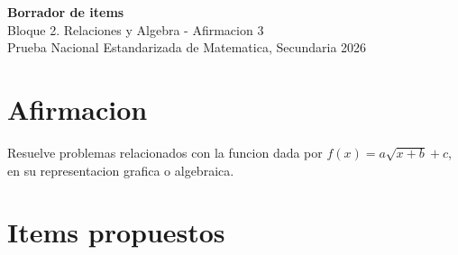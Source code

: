 \documentclass[12pt]{article}
\begin{document}
\begin{center}
  {\Large \textbf{Borrador de items}}\\
  {\large Bloque 2. Relaciones y Algebra - Afirmacion 3}\\[4pt]
  Prueba Nacional Estandarizada de Matematica, Secundaria 2026
\end{center}

\section*{Afirmacion}
Resuelve problemas relacionados con la funcion dada por $f(x)=a\sqrt{x+b}+c$, en su representacion grafica o algebraica.

\section*{Items propuestos}
\end{document}
